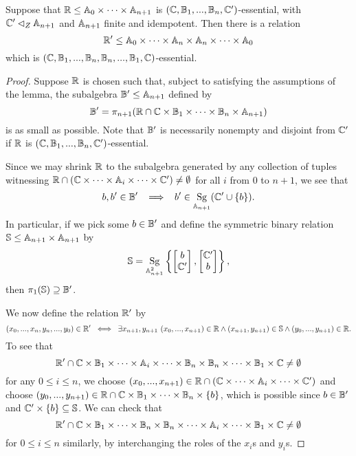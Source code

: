 \documentclass[letterpaper,11pt]{article}
\DeclareMathOperator{\Sg}{Sg}
\begin{document}
\begin{lem} Suppose that $\mathbb{R} \le \mathbb{A}_0 \times \cdots \times \mathbb{A}_{n+1}$ is $(\mathbb{C},\mathbb{B}_1, ..., \mathbb{B}_n, \mathbb{C}')$-essential, with $\mathbb{C}' \lhd_Z \mathbb{A}_{n+1}$ and $\mathbb{A}_{n+1}$ finite and idempotent. Then there is a relation
\[
\mathbb{R}' \le \mathbb{A}_0 \times \cdots \times \mathbb{A}_n \times \mathbb{A}_n \times \cdots \times \mathbb{A}_0
\]
which is $(\mathbb{C},\mathbb{B}_1, ..., \mathbb{B}_n, \mathbb{B}_n, ..., \mathbb{B}_1, \mathbb{C})$-essential.
\end{lem}
\begin{proof} Suppose $\mathbb{R}$ is chosen such that, subject to satisfying the assumptions of the lemma, the subalgebra $\mathbb{B}' \le \mathbb{A}_{n+1}$ defined by
\[
\mathbb{B}' = \pi_{n+1}(\mathbb{R} \cap \mathbb{C}\times \mathbb{B}_1 \times \cdots \times \mathbb{B}_n \times \mathbb{A}_{n+1})
\]
is as small as possible. Note that $\mathbb{B}'$ is necessarily nonempty and disjoint from $\mathbb{C}'$ if $\mathbb{R}$ is $(\mathbb{C},\mathbb{B}_1, ..., \mathbb{B}_n, \mathbb{C}')$-essential.

Since we may shrink $\mathbb{R}$ to the subalgebra generated by any collection of tuples witnessing $\mathbb{R} \cap (\mathbb{C}\times\cdots \times \mathbb{A}_i \times \cdots \times \mathbb{C}') \ne \emptyset$ for all $i$ from $0$ to $n+1$, we see that
\[
b,b' \in \bB' \;\; \implies \;\; b' \in \Sg_{\bA_{n+1}}(\bC' \cup \{b\}).
\]
In particular, if we pick some $b \in \mathbb{B}'$ and define the symmetric binary relation $\mathbb{S} \le \mathbb{A}_{n+1}\times \mathbb{A}_{n+1}$ by
\[
\bS = \Sg_{\bA_{n+1}^2}\left\{\begin{bmatrix} b\\ \bC' \end{bmatrix}, \begin{bmatrix} \bC' \\ b \end{bmatrix}\right\},
\]
then $\pi_1(\mathbb{S}) \supseteq \mathbb{B}'$.

We now define the relation $\mathbb{R}'$ by
\[
(x_0, ..., x_n, y_n, ..., y_0) \in \mathbb{R}' \; \iff \; \exists x_{n+1},y_{n+1}\ (x_0, ..., x_{n+1}) \in \mathbb{R} \wedge (x_{n+1},y_{n+1}) \in \mathbb{S} \wedge (y_0, ..., y_{n+1}) \in \mathbb{R}.
\]
To see that
\[
\mathbb{R}' \cap \mathbb{C}\times\mathbb{B}_1\times \cdots \times \mathbb{A}_i \times \cdots \times \mathbb{B}_n \times \mathbb{B}_n \times \cdots \times \mathbb{B}_1 \times \mathbb{C} \ne \emptyset
\]
for any $0 \le i \le n$, we choose $(x_0, ..., x_{n+1}) \in \mathbb{R} \cap (\mathbb{C}\times\cdots \times \mathbb{A}_i \times \cdots \times \mathbb{C}')$ and choose $(y_0, ..., y_{n+1}) \in \mathbb{R} \cap \mathbb{C}\times \mathbb{B}_1 \times \cdots \times \mathbb{B}_n \times \{b\}$, which is possible since $b \in \mathbb{B}'$ and $\mathbb{C}' \times \{b\} \subseteq \mathbb{S}$. We can check that
\[
\mathbb{R}' \cap \mathbb{C}\times\mathbb{B}_1\times \cdots \times \mathbb{B}_n \times \mathbb{B}_n \times \cdots \times \mathbb{A}_i \times \cdots \times \mathbb{B}_1 \times \mathbb{C} \ne \emptyset
\]
for $0 \le i \le n$ similarly, by interchanging the roles of the $x_i$s and $y_i$s.


\end{proof}
\end{document}
